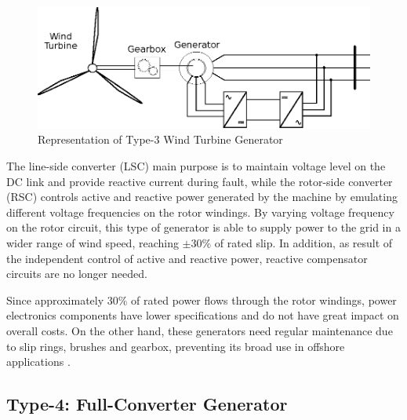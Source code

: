 \begin{figure}[h]
	\caption{Representation of Type-3 Wind Turbine Generator}
	\begin{center}
		\includegraphics[scale=.8]{Images/Type3WTG.eps}
	\end{center}
	\label{fig: WTG3}
\end{figure}

The line-side converter (LSC) main purpose is to maintain voltage level on the DC link and provide reactive current during fault, while the rotor-side converter (RSC) controls active and reactive power generated by the machine by emulating different voltage frequencies on the rotor windings. By varying voltage frequency on the rotor circuit, this type of generator is able to supply power to the grid in a wider range of wind speed, reaching $\pm 30\%$ of rated slip. In addition, as result of the independent control of active and reactive power, reactive compensator circuits are no longer needed\cite{Muljadi2010}.

Since approximately $30\%$ of rated power flows through the rotor windings, power electronics components have lower specifications and do not have great impact on overall costs. On the other hand, these generators need regular maintenance due to slip rings, brushes and gearbox, preventing its broad use in offshore applications \cite{Yaramasu2015}.

\subsection{Type-4: Full-Converter Generator}

